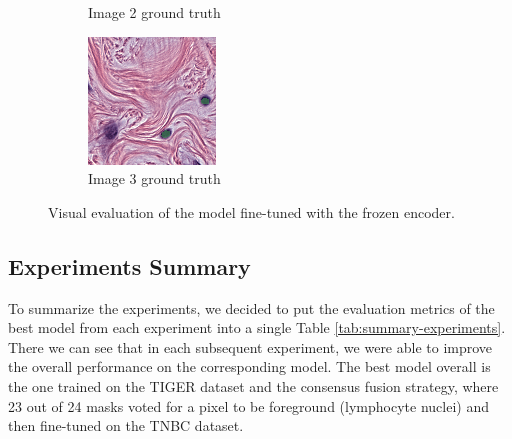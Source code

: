 \begin{figure}[H]
\begin{subfigure}[b]{0.32\textwidth}
    \caption{Image 2 ground truth}
  \end{subfigure}\hfill
  \begin{subfigure}[b]{0.32\textwidth}
    \centering
    \includegraphics[width=\linewidth]{assets/images/for_presentation/exp4-3-gt.png}
    \caption{Image 3 ground truth}
  \end{subfigure}
  \caption{Visual evaluation of the model fine-tuned with the frozen encoder.}
  \label{fig:exp4-results}
\end{figure}

\subsection{Experiments Summary}
To summarize the experiments, we decided to put the evaluation metrics of the best model from each experiment into a single Table \ref{tab:summary-experiments}. There we can see that in each subsequent experiment, we were able to improve the overall performance on the corresponding model. The best model overall is the one trained on the TIGER dataset and the consensus fusion strategy, where 23 out of 24 masks voted for a pixel to be foreground (lymphocyte nuclei) and then fine-tuned on the TNBC dataset.

